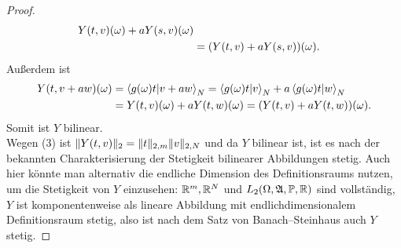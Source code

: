 \begin{proof}
\begin{align*}
Y(t, v)(\omega)+ a Y(s, v)(\omega)\\
&= (Y(t, v) + a Y (s, v))(\omega)\text.
\end{align*}
Außerdem ist
\begin{align*}
Y(t, v+aw)(\omega) &= \left\langle g(\omega)t |v+aw\right\rangle_N
= \left\langle g(\omega)t |v\right\rangle_N+a\left\langle g(\omega)t |w\right\rangle_N\\
&= Y(t, v)(\omega) + a Y(t, w)(\omega)
= (Y(t, v) + a Y(t, w))(\omega)\text.
\end{align*}
Somit ist $Y$ bilinear.\\
Wegen (3) ist $\lVert Y(t, v)\rVert_2 = \lVert t\rVert_{2,m}\lVert v\rVert_{2,N}$ und da $Y$
bilinear ist, ist es nach der bekannten Charakterisierung der Stetigkeit
bilinearer Abbildungen stetig. Auch hier könnte man alternativ die endliche
Dimension des Definitionsraums nutzen, um die Stetigkeit von $Y$ einzusehen:
$\mathbb{R}^m, \mathbb{R}^N$ und $L_2(\Omega, \mathfrak{A}, \mathbb{P}, \mathbb{R})$ sind vollständig, $Y$ ist
komponentenweise als lineare Abbildung mit endlichdimensionalem
Definitionsraum stetig, also ist nach dem Satz von Banach--Steinhaus auch
$Y$ stetig.
\end{proof}